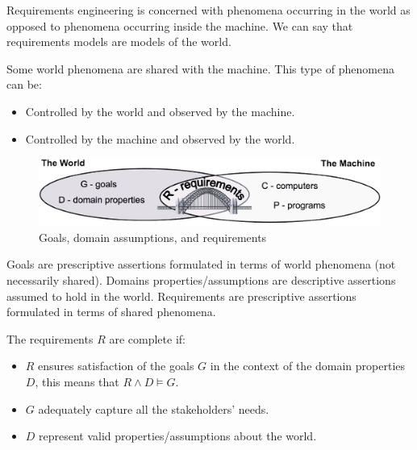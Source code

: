 \documentclass[12pt, a4paper]{report}
\begin{document}
    Requirements engineering is concerned with phenomena occurring in the world as opposed to phenomena occurring inside the machine. We can say that requirements models are models 
    of the world. 
     
    Some world phenomena are shared with the machine. This type of phenomena can be: 
    \begin{itemize}
        \item Controlled by the world and observed by the machine.
        \item Controlled by the machine and observed by the world.
    \end{itemize}
    \begin{figure}[H]
        \centering
        \includegraphics[width=0.75\linewidth]{images/worldmachine.png}
        \caption{Goals, domain assumptions, and requirements}
    \end{figure}
    Goals are prescriptive assertions formulated in terms of world phenomena (not necessarily shared). Domains properties/assumptions are descriptive assertions assumed to hold in 
    the world. Requirements are prescriptive assertions formulated in terms of shared phenomena. 
      
    The requirements $R$ are complete if: 
    \begin{itemize}
        \item $R$ ensures satisfaction of the goals $G$ in the context of the domain properties $D$, this means that $R\land D \models G$.
        \item $G$ adequately capture all the stakeholders' needs.
        \item $D$ represent valid properties/assumptions about the world.
    \end{itemize}
\end{document}

